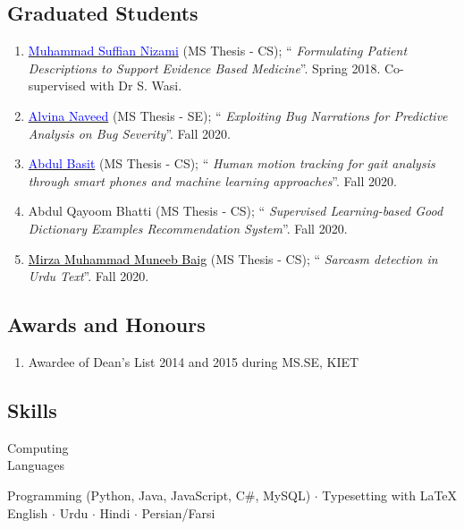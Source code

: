 \documentclass[a4paper, 10pt]{article}
\begin{document}
\subsection*{\textcolor{NavyBlue}{Graduated Students}}
\begin{enumerate}
\itemsep-4pt
\item \href{https://www.linkedin.com/in/msuffian/}{\textcolor{blue}{Muhammad Suffian Nizami}} (MS Thesis - CS); ``\emph{ Formulating Patient Descriptions to Support Evidence Based Medicine}''. Spring 2018. Co-supervised with Dr S. Wasi.

\item \href{https://www.linkedin.com/in/alvina-naveed-7832a0117/}{\textcolor{blue}{Alvina Naveed}} (MS Thesis - SE); ``\emph{ Exploiting Bug Narrations for Predictive Analysis on Bug Severity}''. Fall 2020.

\item \href{https://www.linkedin.com/in/abdul-basit-a151b0b9/}{\textcolor{blue}{Abdul Basit}} (MS Thesis - CS); ``\emph{ Human motion tracking for gait analysis through smart phones and machine learning approaches}''. Fall 2020.

\item Abdul Qayoom Bhatti (MS Thesis - CS); ``\emph{ Supervised Learning-based Good Dictionary Examples Recommendation System}''. Fall 2020.

\item \href{}{\textcolor{black}{Mirza Muhammad Muneeb Baig}} (MS Thesis - CS); ``\emph{ Sarcasm detection in Urdu Text}''. Fall 2020.
\end{enumerate}


\subsection*{\textcolor{NavyBlue}{Awards and Honours}}
\begin{enumerate}
\itemsep-4pt
\item Awardee of Dean's List 2014 and 2015 during MS.SE, KIET
\end{enumerate}


\subsection*{\textcolor{NavyBlue}{Skills}}
\hfill\begin{minipage}{0.17\textwidth}
Computing\textcolor{lightgray}{\dotfill}\\
Languages\textcolor{lightgray}{\dotfill}
\end{minipage}%
\begin{minipage}{0.8\textwidth}
Programming (Python, Java, JavaScript, C\#, MySQL) $\cdot$ Typesetting with \LaTeX\\
English $\cdot$ Urdu $\cdot$ Hindi $\cdot$ Persian/Farsi %
\end{minipage}
\end{document}
